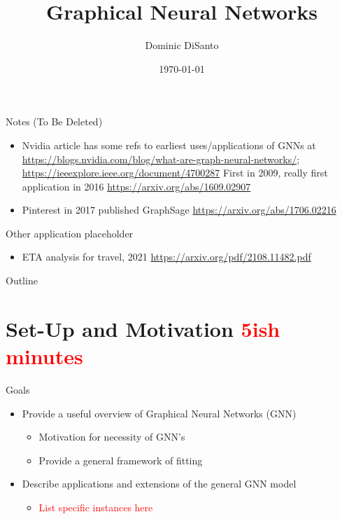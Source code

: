 \documentclass{beamer}
\title{Graphical Neural Networks}
\author{Dominic DiSanto}
\institute[]{Department of Biostatistics, Harvard University}
\date{\today}
\begin{document}
\begin{frame}{Notes (To Be Deleted)}
    \begin{itemize}
        \item Nvidia article has some refs to earliest uses/applications of GNNs at \url{https://blogs.nvidia.com/blog/what-are-graph-neural-networks/}; \url{https://ieeexplore.ieee.org/document/4700287} First in 2009, really first application in 2016 \url{https://arxiv.org/abs/1609.02907}
        \item Pinterest in 2017 published GraphSage \url{https://arxiv.org/abs/1706.02216}
    \end{itemize}
\end{frame}


\begin{frame}{Other application placeholder}
    \begin{itemize}
        \item ETA analysis for travel, 2021 \url{https://arxiv.org/pdf/2108.11482.pdf}
    \end{itemize}
\end{frame}


\begin{frame}
\maketitle
\end{frame}

\begin{frame}{Outline}
\tableofcontents 
\end{frame}


\section{Set-Up and Motivation \textcolor{red}{5ish minutes}}

\begin{frame}{Goals}
    \begin{itemize}\setlength\itemsep{8mm}
        \item Provide a useful overview of Graphical Neural Networks (GNN)
        \begin{itemize}
            \item Motivation for necessity of GNN's 
            \item Provide a general framework of fitting 
        \end{itemize}
        \item Describe applications and extensions of the general GNN model 
        \begin{itemize}
            \item \textcolor{red}{List specific instances here}
        \end{itemize}
    \end{itemize}
\end{frame}
\end{document}
